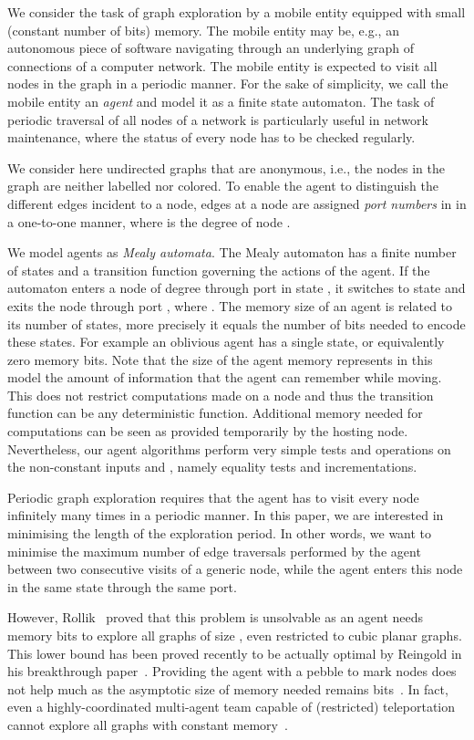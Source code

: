 \documentclass[11pt,envcountsame,oribibl]{llncs}
\begin{document}
We consider the task of graph exploration by a mobile entity
equipped with small (constant number of bits) memory. The mobile
entity may be, e.g., an autonomous piece of software navigating
through an underlying graph of connections of a computer network.
The mobile entity is expected to visit all nodes in the graph in a
periodic manner. For the sake of simplicity, we call the mobile
entity an {\em agent} and model it as a finite state automaton. The
task of periodic traversal of all nodes of a network is particularly
useful in network maintenance, where the status of every node has to
be checked regularly.

We consider here undirected graphs that are anonymous, i.e., the nodes
in the graph are neither labelled nor colored. To enable the agent to
distinguish the different edges incident to a node, edges at a node
 are assigned {\em port numbers} in  in a
one-to-one manner, where  is the degree of node .

We model agents as {\em Mealy
  automata}. The Mealy automaton has a finite number of states and a
transition function  governing the actions of the agent.
If the automaton enters a node  of degree  through
port  in state , it switches to state  and exits the node
through port , where . The memory size of an
agent is related to its number of states, more precisely it equals the
number of bits needed to encode these states. For example an oblivious
agent has a single state, or equivalently zero memory bits. Note that
the size of the agent memory represents in this model the amount of
information that the agent can remember while moving. This does not
restrict computations made on a node and thus the transition function
can be any deterministic function. Additional memory needed for
computations can be seen as provided temporarily by the hosting
node. Nevertheless, our agent algorithms perform very simple tests and
operations on the non-constant inputs  and , namely equality
tests and incrementations.

Periodic graph exploration requires that the agent has to visit
every node infinitely many times in a periodic manner. In this
paper, we are interested in minimising the length of the
exploration period. In other words, we want to minimise the maximum
number of edge traversals performed by the agent between two
consecutive visits of a generic node, while the agent enters this
node in the same state through the same port.

However, Rollik~\cite{Rol80} proved that this problem is
unsolvable as an agent needs  memory bits to explore
all graphs of size , even restricted to cubic planar graphs. This
lower bound has been proved recently to be actually optimal by
Reingold in his breakthrough paper~\cite{Rein}. Providing the agent
with a pebble to mark nodes does not help much as the asymptotic size
of memory needed remains 
bits~\cite{FraIlcRajTix06}. In fact, even a highly-coordinated
multi-agent team capable of (restricted) teleportation cannot explore
all graphs with constant memory~\cite{CooRac80}.
\end{document}
